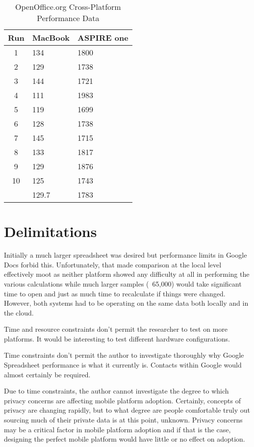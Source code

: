 \begin{table}
  \begin{tabular}{| c | l | l |}
    \hline
    Run  & MacBook & ASPIRE one \\ \hline
    1    & 134     & 1800       \\ \hline
    2    & 129     & 1738       \\ \hline
    3    & 144     & 1721       \\ \hline
    4    & 111     & 1983       \\ \hline
    5    & 119     & 1699       \\ \hline
    6    & 128     & 1738       \\ \hline
    7    & 145     & 1715       \\ \hline
    8    & 133     & 1817       \\ \hline
    9    & 129     & 1876       \\ \hline
    10   & 125     & 1743       \\ \hline
         & 129.7   & 1783       \\
    \hline
  \end{tabular}
  \caption{OpenOffice.org Cross-Platform Performance Data}
  \label{ooCp}
\end{table}

\section{Delimitations}


Initially a much larger spreadsheet was desired but performance limits in Google
Docs forbid this.  Unfortunately, that made comparison at the local level
effectively moot as neither platform showed any difficulty at all in performing
the various calculations while much larger samples (~65,000) would take
significant time to open and just as much time to recalculate if things were
changed.  However, both systems had to be operating on the same data both
locally and in the cloud.

Time and resource constraints don't permit the researcher to test on more
platforms.  It would be interesting to test different hardware configurations.

Time constraints don't permit the author to investigate thoroughly why Google
Spreadsheet performance is what it currently is.  Contacts within Google would
almost certainly be required.

Due to time constraints, the author cannot investigate the degree to which
privacy concerns are affecting mobile platform adoption.  Certainly, concepts of
privacy are changing rapidly, but to what degree are people comfortable truly
out sourcing much of their private data is at this point, unknown.  Privacy
concerns may be a critical factor in mobile platform adoption and if that is the
case, designing the perfect mobile platform would have little or no effect on
adoption.

